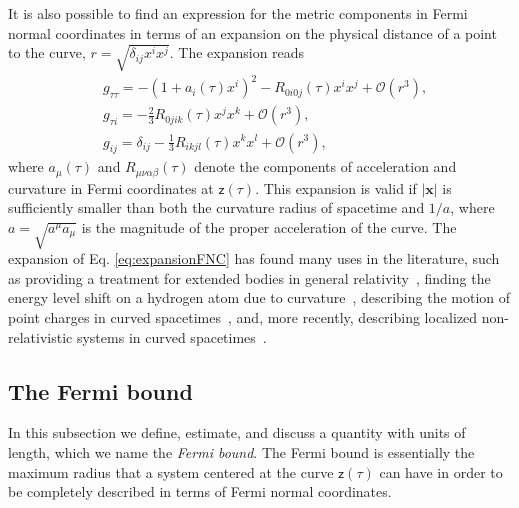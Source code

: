 \documentclass[prd,twocolumn,superscriptaddress,floatfix,amsmath,amssymb,amsfonts,longbibliography,nofootinbib]{revtex4-1}
\newcommand{\mf}{\mathsf}%
\begin{document}
It is also possible to find an expression for the metric components in Fermi normal coordinates in terms of an expansion on the physical distance of a point to the curve, $r=\sqrt{\delta_{ij}x^ix^j}$. The expansion reads
\begin{align}\label{eq:expansionFNC}
        &g_{\tau \tau}=-\left(1+a_i(\tau) x^i\right)^2-R_{0 {{i}} 0 {{j}}}(\tau)  x^{i}  x^{j} + \mathcal{O}(r^3),\nonumber\\
        &g_{\tau i}=-\frac{2}{3} R_{0 {{j}}{{i}}{{k}}}(\tau)  x^{j}  x^{k}+ \mathcal{O}(r^3),\nonumber\\
        &g_{ij}=\delta_{{{i}}{{j}}}-\frac{1}{3} R_{{{i}}{{k}}{{j}}{{l}}}(\tau)  x^{k}  x^{l}+ \mathcal{O}(r^3),
\end{align}
where $a_\mu(\tau)$ and $R_{\mu\nu\alpha\beta}(\tau)$ denote the components of acceleration and curvature in Fermi coordinates at $\mf z(\tau)$. This expansion is valid if $|\bm x|$ is sufficiently smaller than both the curvature radius of spacetime and $1/a$, where $a = \sqrt{a^\mu a_\mu}$ is the magnitude of the proper acceleration of the curve. The expansion of Eq. \eqref{eq:expansionFNC} has found many uses in the literature, such as providing a treatment for extended bodies in general relativity~\cite{DixonI,DixonII,DixonIII}, finding the energy level shift on a hydrogen atom due to curvature~\cite{parker,ParkerRevLett,ParkerHydrogen}, describing the motion of point charges in curved spacetimes~\cite{poisson}, and, more recently, describing localized non-relativistic systems in curved spacetimes~\cite{us,jonas,mine,theguy}.

\subsection{The Fermi bound}\label{sub:fermibound}

In this subsection we define, estimate, and discuss a quantity with units of length, which we name the \emph{Fermi bound}. The Fermi bound is essentially the maximum radius that a system centered at the curve $\mf z(\tau)$ can have in order to be completely described in terms of Fermi normal coordinates.
\end{document}
